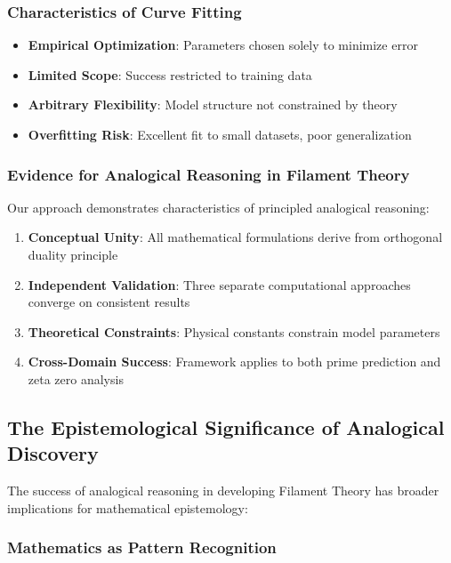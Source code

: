 \subsubsection{Characteristics of Curve Fitting}

\begin{itemize}
\item \textbf{Empirical Optimization}: Parameters chosen solely to minimize error
\item \textbf{Limited Scope}: Success restricted to training data
\item \textbf{Arbitrary Flexibility}: Model structure not constrained by theory
\item \textbf{Overfitting Risk}: Excellent fit to small datasets, poor generalization
\end{itemize}

\subsubsection{Evidence for Analogical Reasoning in Filament Theory}

Our approach demonstrates characteristics of principled analogical reasoning:

\begin{enumerate}
\item \textbf{Conceptual Unity}: All mathematical formulations derive from orthogonal duality principle
\item \textbf{Independent Validation}: Three separate computational approaches converge on consistent results
\item \textbf{Theoretical Constraints}: Physical constants constrain model parameters
\item \textbf{Cross-Domain Success}: Framework applies to both prime prediction and zeta zero analysis
\end{enumerate}

\subsection{The Epistemological Significance of Analogical Discovery}

The success of analogical reasoning in developing Filament Theory has broader implications for mathematical epistemology:

\subsubsection{Mathematics as Pattern Recognition}

